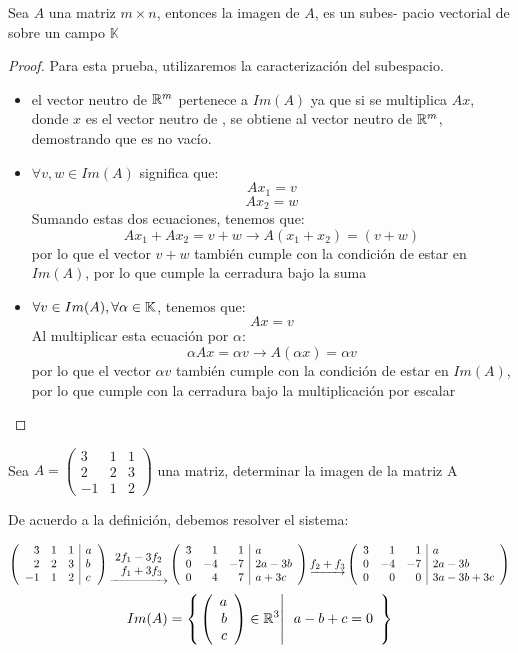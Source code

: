 \begin{theorem}
Sea $A$ una matriz $m \times n$, entonces la imagen de $A$, es un subes-
pacio vectorial de \rmm sobre un campo $\mathbb{K}$
\end{theorem}
\begin{proof}
    Para esta prueba, utilizaremos la caracterización del subespacio.
    \begin{itemize}
        \item el vector neutro de $\mathbb{R}^m$ pertenece a $Im(A)$ ya que si se multiplica $Ax$, donde $x$ es el vector neutro de \rn, se obtiene al vector neutro de $\mathbb{R}^m$, demostrando que es no vacío.
        \item $\forall v,w \in Im(A)$ significa que:
        $$Ax_1 = v$$
        $$Ax_2 = w$$
        Sumando estas dos ecuaciones, tenemos que:
        $$Ax_1 + Ax_2 = v + w \rightarrow A(x_1 + x_2) = (v+w)$$
        por lo que el vector $v+w$ también cumple con la condición de estar en $Im(A)$, por lo que cumple la cerradura bajo la suma
        \item $\forall v \in Im(A), \forall \alpha \in \mathbb{K}$, tenemos que:
        $$Ax = v$$
        Al multiplicar esta ecuación por $\alpha$:
        $$\alpha Ax = \alpha v \rightarrow A(\alpha x) = \alpha v$$
        por lo que el vector $\alpha v$ también cumple con la condición de estar en $Im(A)$, por lo que cumple con la cerradura bajo la multiplicación por escalar
    \end{itemize}
\end{proof}
\begin{ejemplo}
Sea $A=
\left(
\begin{array}{rrr}
3&1&1\\
2&2&3\\
-1&1&2
\end{array}
\right)$ una matriz, determinar la imagen de la matriz A
 
De acuerdo a la definición, debemos resolver el sistema:

$$\reducir{{rrr|l}}{3&1&1&a\\2&2&3&b\\-1&1&2&c}
\underrightarrow{\begin{array}{r}
    2f_1 - 3f_2 \\
    f_1 + 3f_3
\end{array}}
\reducir{rrr|l}{3&1&1&a\\0&-4&-7&2a-3b\\0&4&7&a+3c}
\underrightarrow{f_2 + f_3}
\reducir{rrr|l}{3&1&1&a\\0&-4&-7&2a-3b\\0&0&0&3a-3b+3c}$$
\[Im(A)=\left\{ \left. \left( \begin{array}{r} a\\ b\\ c \end{array} \right)  \in \mathbb{R}^3\right| \begin{array}{r}
a-b+c=0\\
\end{array} \right\}
\]

\end{ejemplo}

